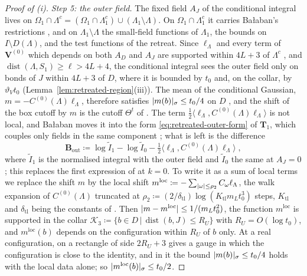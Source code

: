 \documentclass[11pt]{preprint}
\newcommand{\dist}{\operatorname{dist}}
\DeclarePairedDelimiter{\abs}{\lvert}{\rvert}
\numberwithin{equation}{section}
\theoremstyle{definition}
\theoremstyle{remark}
\theoremstyle{plain}
\begin{document}
\begin{proof}[Proof of (i)]
\emph{Step 5: the outer field.} The fixed field $A_J$ of the conditional integral lives on $\Omega_1 \cap \Lambda^c = (\Omega_1 \cap \Lambda_1^c) \cup (\Lambda_1 \setminus \Lambda)$. On $\Omega_1 \cap \Lambda_1^c$ it carries Ba{\l}aban's restrictions \cite[(1.25), p.~252]{BalabanCRE}, and on $\Lambda_1 \setminus \Lambda$ the small-field functions of $\Lambda_1$, the bounds on $I \setminus D(\Lambda)$, and the test functions of the retreat. Since $\ell_\Lambda$ and every term of $\mathbf V^{(0)}$ which depends on both $A_D$ and $A_J$ are supported within $4L + 3$ of $\Lambda^c$ \cite[Section~3.3]{WilsonFirstStep}, and $\dist(\Lambda, S_1) \geq \ell > 4L + 4$, the conditional integral sees the outer field only on bonds of $J$ within $4L + 3$ of $D$, where it is bounded by $t_0$ and, on the collar, by $\vartheta_Vt_0$ (Lemma~\ref{lem:retreated-region}(iii)). The mean of the conditional Gaussian, $m = -C^{(0)}(\Lambda)\ell_\Lambda$, therefore satisfies $\abs{m(b)}_\sigma \leq t_0/4$ on $D$ \cite[(9.11), Remark~9.11]{WilsonFirstStep}, and the shift of the box cutoff by $m$ is the cutoff $\Theta^t$ of \cite[(9.13)]{WilsonFirstStep}. The term $\frac12\langle\ell_\Lambda, C^{(0)}(\Lambda)\ell_\Lambda\rangle$ is not local, and Ba{\l}aban moves it into the form \eqref{eq:retreated-outer-form} of $\mathbf T_1$, which couples only fields in the same component \cite[p.~258]{BalabanCRE}; what is left is the difference
\[
    \mathbf B_{\mathrm{out}} \coloneqq \log\tilde I_1 - \log\tilde I_0 - \tfrac12\langle\ell_\Lambda, C^{(0)}(\Lambda)\ell_\Lambda\rangle\;,
\]
where $\tilde I_1$ is the normalised integral with the outer field and $\tilde I_0$ the same at $A_J = 0$; this replaces the first expression of \cite[(3.28)]{BalabanCRE} at $k = 0$. To write it as a sum of local terms we replace the shift $m$ by the local shift $m^{\mathrm{loc}} \coloneqq -\sum_{\abs{\omega} \leq \rho_2}C_\omega\ell_\Lambda$, the walk expansion of $C^{(0)}(\Lambda)$ \cite[(3.107), p.~416]{BalabanPBG} truncated at $\rho_2 \coloneqq (2/\delta_{\mathrm{tl}})\log(K_{\mathrm{tl}}m_Lt_0^3)$ steps, $K_{\mathrm{tl}}$ and $\delta_{\mathrm{tl}}$ being the constants of \cite[(3.108)]{BalabanPBG}. Then $\abs{m - m^{\mathrm{loc}}} \leq 1/(m_Lt_0^2)$, the function $m^{\mathrm{loc}}$ is supported in the collar $\mathcal K_3 \coloneqq \{ b \in D \,|\, \dist(b, J) \leq R_U \}$ with $R_U = O(\log t_0)$, and $m^{\mathrm{loc}}(b)$ depends on the configuration within $R_U$ of $b$ only. At a real configuration, \cite[Lemma~B.5]{WilsonFirstStep} on a rectangle of side $2R_U + 3$ gives a gauge in which the configuration is close to the identity, and in it the bound $\abs{m(b)}_\sigma \leq t_0/4$ holds with the local data alone; so $\abs{m^{\mathrm{loc}}(b)}_\sigma \leq t_0/2$.


\end{proof}
\end{document}
